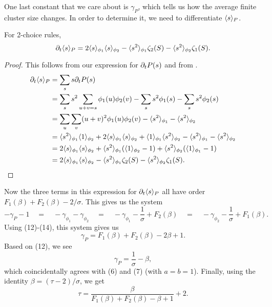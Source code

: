 \documentclass[twoside,10pt]{article}
\begin{document}
One last constant that we care about is $\gamma_{P}$, which tells us how the average finite cluster size changes. In order to determine it, we need to differentiate $\langle s \rangle_{P}$.

\begin{prop}
For 2-choice rules,
\[
	\partial_{t}{\langle s \rangle_{P}} = 2\langle s \rangle_{\phi_1}\langle s \rangle_{\phi_2} - \langle s^2 \rangle_{\phi_1}\zeta_2(S) - \langle s^2 \rangle_{\phi_2}\zeta_1(S).
\]
\end{prop}
\begin{proof}
	This follows from our expression for $\partial_{t}{P(s)} $ and from .
	\begin{align*}
		\partial_{t}{\langle s \rangle_{P}} &= \sum_s s \partial_{t}{P(s)} \\
				    &= \sum_s s^2 \sum_{u+v=s}\phi_1(u)\phi_2(v) - \sum_s s^2 \phi_1(s) - \sum_s s^2 \phi_2(s) \\
				    &= \sum_{u}\sum_{v} (u+v)^2\phi_1(u) \phi_2(v) - \langle s^2 \rangle_{\phi_1}-\langle s^2 \rangle_{\phi_2} \\
				    &= \langle s^2 \rangle_{\phi_1}\langle 1 \rangle_{\phi_2} + 2\langle s \rangle_{\phi_1}\langle s \rangle_{\phi_2} + \langle 1 \rangle_{\phi_1}\langle s^2 \rangle_{\phi_2}- \langle s^2 \rangle_{\phi_1}-\langle s^2 \rangle_{\phi_2} \\
				    &= 2\langle s \rangle_{\phi_1}\langle s \rangle_{\phi_2} + \langle s^2 \rangle_{\phi_1}(\langle 1 \rangle_{\phi_2} - 1) + \langle s^2 \rangle_{\phi_2}(\langle 1 \rangle_{\phi_1}-1) \\
				    &= 2\langle s \rangle_{\phi_1}\langle s \rangle_{\phi_2} - \langle s^2 \rangle_{\phi_1}\zeta_2(S) - \langle s^2 \rangle_{\phi_2}\zeta_1(S).
	\end{align*}
\end{proof}

Now the three terms in this expression for $\partial_{t}{\langle s \rangle_{P}} $ all have order $F_1(\beta)+F_2(\beta) - 2/\sigma$. This gives us the system
\[
	-\gamma_{P}-1 \quad=\quad -\gamma_{\phi_1}-\gamma_{\phi_2} \quad=\quad -\gamma_{\phi_1}-\frac{1}{\sigma} +F_2(\beta) \quad=\quad -\gamma_{\phi_2}-\frac{1}{\sigma} + F_1(\beta).
\]
Using (12)-(14), this system gives us
\begin{equation}
	\gamma_{P} = F_1(\beta)+F_2(\beta) - 2\beta + 1.
\end{equation}
Based on (12), we see
\[
\gamma_{P} = \frac{1}{\sigma} -\beta,
\] which coincidentally agrees with (6) and (7) (with $a=b=1$). Finally, using the identity $\beta = (\tau-2)/\sigma$, we get
\begin{equation}
	\tau = \frac{\beta}{F_1(\beta)+F_2(\beta)-\beta+1} +2.
\end{equation}

\end{document}
